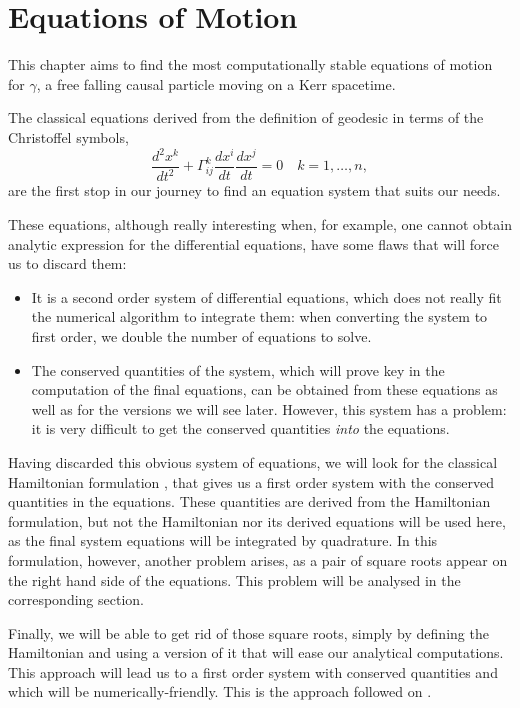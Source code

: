 \chapter{Equations of Motion}

This chapter aims to find the most computationally stable equations of motion for $\gamma$, a free falling causal particle moving on a Kerr spacetime.

The classical equations derived from the definition of geodesic in terms of the Christoffel symbols,
\[
	\frac{d^2x^k}{dt^2} + \Gamma^k_{ij} \frac{d x^i}{dt} \frac{d x^j}{dt} = 0 \quad k = 1, \dots, n,
\]
are the first stop in our journey to find an equation system that suits our needs.

These equations, although really interesting when, for example, one cannot obtain analytic expression for the differential equations, have some flaws that will force us to discard them:
\begin{itemize}
	\item It is a second order system of differential equations, which does not really fit the numerical algorithm to integrate them: when converting the system to first order, we double the number of equations to solve.
	\item The conserved quantities of the system, which will prove key in the computation of the final equations, can be obtained from these equations as well as for the versions we will see later. However, this system has a problem: it is very difficult to get the conserved quantities \emph{into} the equations.
\end{itemize}

Having discarded this obvious system of equations, we will look for the classical Hamiltonian formulation \cite[Sec. 33.5]{thorne73}, that gives us a first order system with the conserved quantities in the equations. These quantities are derived from the Hamiltonian formulation, but not the Hamiltonian nor its derived equations will be used here, as the final system equations will be integrated by quadrature. In this formulation, however, another problem arises, as a pair of square roots appear on the right hand side of the equations. This problem will be analysed in the corresponding section.

Finally, we will be able to get rid of those square roots, simply by defining the Hamiltonian and using a version of it that will ease our analytical computations. This approach will lead us to a first order system with conserved quantities and which will be numerically-friendly. This is the approach followed on \cite{thorne15}.

